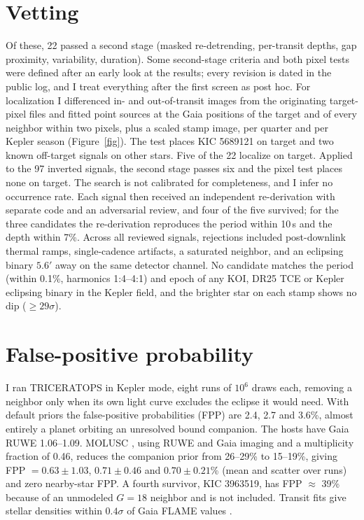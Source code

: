 \documentclass[RNAAS]{aastex701}
\begin{document}
\section{Vetting}
Of these, 22 passed a second stage (masked re-detrending, per-transit depths, gap proximity, variability, duration). Some second-stage criteria and both pixel tests were defined after an early look at the results; every revision is dated in the public log, and I treat everything after the first screen as post hoc. For localization I differenced in- and out-of-transit images from the originating target-pixel files and fitted point sources at the Gaia positions of the target and of every neighbor within two pixels, plus a scaled stamp image, per quarter and per Kepler season (Figure~\ref{fig}). The test places KIC 5689121 on target and two known off-target signals on other stars. Five of the 22 localize on target. Applied to the 97 inverted signals, the second stage passes six and the pixel test places none on target. The search is not calibrated for completeness, and I infer no occurrence rate. Each signal then received an independent re-derivation with separate code and an adversarial review, and four of the five survived; for the three candidates the re-derivation reproduces the period within 10\,s and the depth within 7\%. Across all reviewed signals, rejections included post-downlink thermal ramps, single-cadence artifacts, a saturated neighbor, and an eclipsing binary $5.6'$ away on the same detector channel. No candidate matches the period (within 0.1\%, harmonics 1:4--4:1) and epoch of any KOI, DR25 TCE \citep{Thompson2018} or Kepler eclipsing binary \citep{Kirk2016} in the Kepler field, and the brighter star on each stamp shows no dip ($\geq29\sigma$).

\section{False-positive probability}
I ran TRICERATOPS \citep{Giacalone2021} in Kepler mode, eight runs of $10^6$ draws each, removing a neighbor only when its own light curve excludes the eclipse it would need. With default priors the false-positive probabilities (FPP) are 2.4, 2.7 and 3.6\%, almost entirely a planet orbiting an unresolved bound companion. The hosts have Gaia RUWE 1.06--1.09. MOLUSC \citep{Wood2021}, using RUWE and Gaia imaging and a multiplicity fraction of 0.46, reduces the companion prior from 26--29\% to 15--19\%, giving FPP $= 0.63 \pm 1.03$, $0.71 \pm 0.46$ and $0.70 \pm 0.21$\% (mean and scatter over runs) and zero nearby-star FPP. A fourth survivor, KIC 3963519, has FPP $\approx$ 39\% because of an unmodeled $G=18$ neighbor and is not included. Transit fits \citep{Kreidberg2015,ForemanMackey2013} give stellar densities within $0.4\sigma$ of Gaia FLAME values \citep{Creevey2023}.
\end{document}
